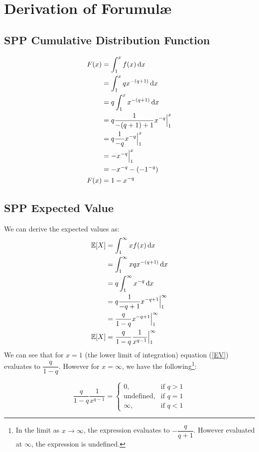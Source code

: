 \documentclass[]{article} %
\begin{document}
\section{Derivation of Forumul\ae}
\subsection{SPP Cumulative Distribution Function}\label{ParetoF}
\begin{align}
	F(x) &= \int_{1}^{x} f(x) \operatorname{d \!} x \nonumber\\
		&= \int_{1}^{x}qx^{-(q+1)} \operatorname{d \!} x\nonumber\\
		&= q \int_{1}^{x}x^{-(q+1)} \operatorname{d \!} x\nonumber\\
		&= q \frac{1}{-(q+1)+1} x^{-q} \Big|_{1}^{x}\nonumber\\
		&=  q \frac{1}{-q} x^{-q} \Big|_{1}^{x}\nonumber\\
		&=  - x^{-q}\Big|_{1}^{x}\nonumber\\
		&= -x^{-q} - (-1^{-q})\nonumber\\
	 F(x) &=  1 - x^{-q}
\end{align}
\subsection{SPP Expected Value}\label{derive:ParetoEV}
We can derive the expected values as:
\begin{align}
\mathbb{E}[X] & = \int_{1}^{\infty}x f(x) \operatorname{d \!} x \nonumber\\
& = \int_{1}^{\infty}xqx^{-(q+1)} \operatorname{d \!} x\nonumber\\
& = q \int_{1}^{\infty}x^{-q} \operatorname{d \!} x\nonumber\\
& = q \frac{1}{-q+1} x^{-q+1} \Big|_{1}^{\infty}\nonumber\\
& = \frac{q}{1-q} x^{-q+1} \Big|_{1}^{\infty}\nonumber\\
\mathbb{E}[X] 	& = \frac{q}{1-q} \dfrac{1}{x^{q-1}} \Big|_{1}^{\infty}\label{EV}
\end{align}
We can see that for $x = 1$ (the lower limit of integration) equation (\ref{EV}) evaluates to $\dfrac{q}{1-q}$. However for $x = \infty$, we have the following\footnote{In the limit as $x\to\infty$, the expression evaluates to  $-\dfrac{q}{q+1}$. However evaluated at $\infty$, the expression is undefined.}:

\[
\frac{q}{1-q} \dfrac{1}{x^{q-1}} = 
\begin{cases}
0,& \text{if } q > 1\\
\text{undefined},& \text{if } q = 1\\         
\infty, & \text{if }q < 1
\end{cases}
\]
\end{document}

